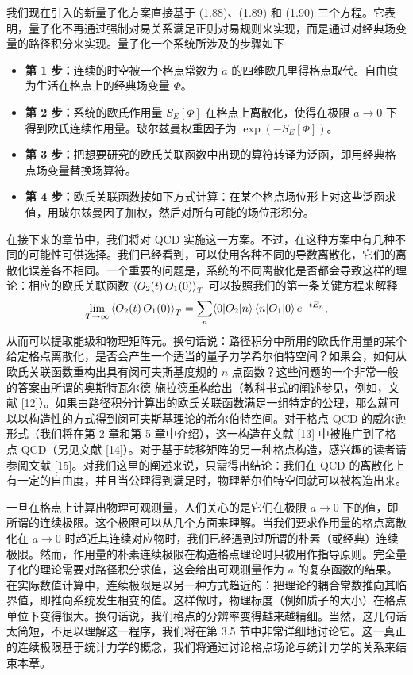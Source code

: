 我们现在引入的新量子化方案直接基于 (1.88)、(1.89) 和 (1.90) 三个方程。它表明，量子化不再通过强制对易关系满足正则对易规则来实现，而是通过对经典场变量的路径积分来实现。量子化一个系统所涉及的步骤如下
\begin{itemize}
  \item \textbf{第 1 步：}连续的时空被一个格点常数为 $a$ 的四维欧几里得格点取代。自由度为生活在格点上的经典场变量 $\Phi$。
  \item \textbf{第 2 步：}系统的欧氏作用量 $S_E[\Phi]$ 在格点上离散化，使得在极限 $a \to 0$ 下得到欧氏连续作用量。玻尔兹曼权重因子为 $\exp(-S_E[\Phi])$。
  \item \textbf{第 3 步：}把想要研究的欧氏关联函数中出现的算符转译为泛函，即用经典格点场变量替换场算符。
  \item \textbf{第 4 步：}欧氏关联函数按如下方式计算：在某个格点场位形上对这些泛函求值，用玻尔兹曼因子加权，然后对所有可能的场位形积分。
\end{itemize}

在接下来的章节中，我们将对 QCD 实施这一方案。不过，在这种方案中有几种不同的可能性可供选择。我们已经看到，可以使用各种不同的导数离散化，它们的离散化误差各不相同。一个重要的问题是，系统的不同离散化是否都会导致这样的理论：相应的欧氏关联函数 $\left\langle O_2(t)\,O_1(0) \right\rangle_T$ 可以按照我们的第一条关键方程来解释
\begin{equation}
  \lim_{T\to\infty}\left\langle O_2(t)\,O_1(0) \right\rangle_T
  = \sum_n \langle0|O_2|n\rangle\,\langle n|O_1|0\rangle\,e^{-tE_n},
\end{equation}
从而可以提取能级和物理矩阵元。换句话说：路径积分中所用的欧氏作用量的某个给定格点离散化，是否会产生一个适当的量子力学希尔伯特空间？如果会，如何从欧氏关联函数重构出具有闵可夫斯基度规的 $n$ 点函数？这些问题的一个非常一般的答案由所谓的奥斯特瓦尔德-施拉德重构给出（教科书式的阐述参见，例如，文献 [12]）。如果由路径积分计算出的欧氏关联函数满足一组特定的公理，那么就可以以构造性的方式得到闵可夫斯基理论的希尔伯特空间。对于格点 QCD 的威尔逊形式（我们将在第 2 章和第 5 章中介绍），这一构造在文献 [13] 中被推广到了格点 QCD（另见文献 [14]）。对于基于转移矩阵的另一种格点构造，感兴趣的读者请参阅文献 [15]。对我们这里的阐述来说，只需得出结论：我们在 QCD 的离散化上有一定的自由度，并且当公理得到满足时，物理希尔伯特空间就可以被构造出来。

一旦在格点上计算出物理可观测量，人们关心的是它们在极限 $a \to 0$ 下的值，即所谓的连续极限。这个极限可以从几个方面来理解。当我们要求作用量的格点离散化在 $a \to 0$ 时趋近其连续对应物时，我们已经遇到过所谓的朴素（或经典）连续极限。然而，作用量的朴素连续极限在构造格点理论时只被用作指导原则。完全量子化的理论需要对路径积分求值，这会给出可观测量作为 $a$ 的复杂函数的结果。在实际数值计算中，连续极限是以另一种方式趋近的：把理论的耦合常数推向其临界值，即推向系统发生相变的值。这样做时，物理标度（例如质子的大小）在格点单位下变得很大。换句话说，我们格点的分辨率变得越来越精细。当然，这几句话太简短，不足以理解这一程序，我们将在第 3.5 节中非常详细地讨论它。这一真正的连续极限基于统计力学的概念，我们将通过讨论格点场论与统计力学的关系来结束本章。

